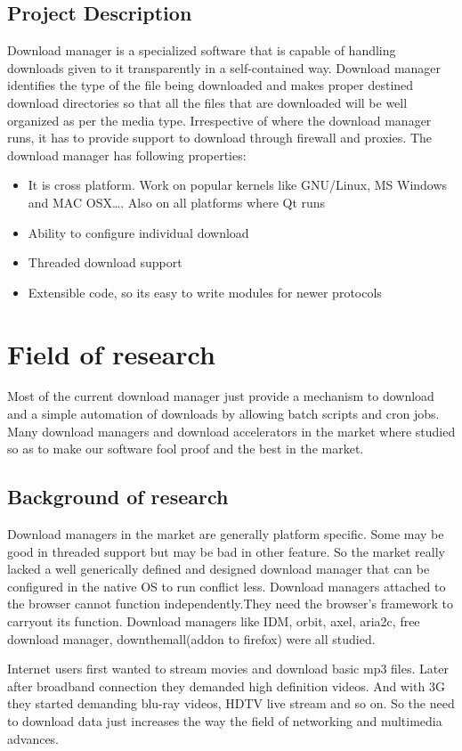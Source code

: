 \documentclass[pdftex,12pt,a4paper,pdfencoding=unicode]{article}
\begin{document}
\begin{onehalfspace}
      \subsection{Project Description}
      Download manager is a specialized software that is capable of handling downloads given to it transparently in a self-contained
      way. Download manager identifies the type of the file being downloaded and makes proper destined download directories so that
      all the files that are downloaded will be well organized as per the media type. Irrespective of where the download manager runs,
      it has to provide support to download through firewall and proxies. The download manager has following properties:
      \begin{itemize}
      \item It is cross platform. Work on popular kernels like GNU/Linux, MS Windows and MAC OSX\ldots. Also on all platforms where Qt runs
      \item Ability to configure individual download
      \item Threaded download support
      \item Extensible code, so its easy to write modules for newer protocols
      \end{itemize}
\newpage
      \section{Field of research}
      Most of the current download manager just provide a mechanism to download and a simple automation of downloads by allowing batch
      scripts and cron jobs. Many download managers and download accelerators in the market where studied so as to make our software
      fool proof and the best in the market.

      \subsection{Background of research}
      Download managers in the market are generally platform specific. Some may be good in threaded support but may be bad in other feature.
      So the market really lacked a well generically defined and designed download manager that can be configured in the native OS to run
      conflict less. Download managers attached to the browser cannot function independently.They need the browser's framework to carryout
      its function. Download managers like IDM, orbit, axel, aria2c, free download manager, downthemall(addon to firefox) were all studied.

      Internet users first wanted to stream movies and download basic mp3 files. Later after broadband connection they demanded high
      definition videos. And with 3G they started demanding blu-ray videos, HDTV live stream and so on. So the need to download data 
      just increases the way the field of networking and multimedia advances.

      

\end{onehalfspace}
\end{document}
